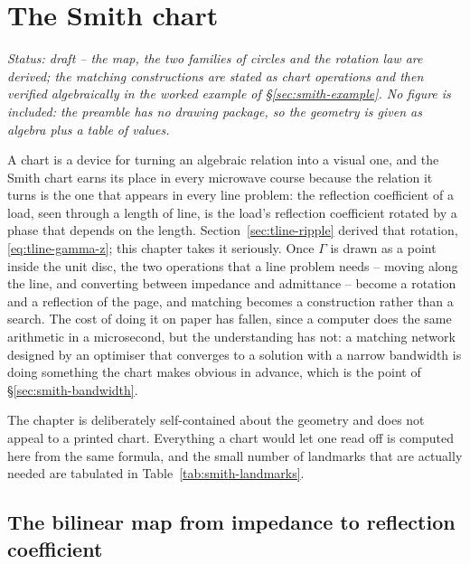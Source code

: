 \section{The Smith chart}
\label{sec:smith}

\noindent\emph{Status: draft -- the map, the two families of circles and the rotation law are derived; the matching
constructions are stated as chart operations and then verified algebraically in the worked example of
\S\ref{sec:smith-example}. No figure is included: the preamble has no drawing package, so the geometry is given
as algebra plus a table of values.}

A chart is a device for turning an algebraic relation into a visual one, and the Smith chart earns its place in
every microwave course because the relation it turns is the one that appears in every line problem: the reflection
coefficient of a load, seen through a length of line, is the load's reflection coefficient rotated by a phase that
depends on the length. Section~\ref{sec:tline-ripple} derived that rotation, \eqref{eq:tline-gamma-z}; this
chapter takes it seriously. Once $\Gamma$ is drawn as a point inside the unit disc, the two operations that a
line problem needs -- moving along the line, and converting between impedance and admittance -- become a
rotation and a reflection of the page, and matching becomes a construction rather than a search. The cost of
doing it on paper has fallen, since a computer does the same arithmetic in a microsecond, but the understanding
has not: a matching network designed by an optimiser that converges to a solution with a narrow bandwidth is
doing something the chart makes obvious in advance, which is the point of \S\ref{sec:smith-bandwidth}.

The chapter is deliberately self-contained about the geometry and does not appeal to a printed chart. Everything a
chart would let one read off is computed here from the same formula, and the small number of landmarks that are
actually needed are tabulated in Table~\ref{tab:smith-landmarks}.

\subsection{The bilinear map from impedance to reflection coefficient}
\label{sec:smith-map}

